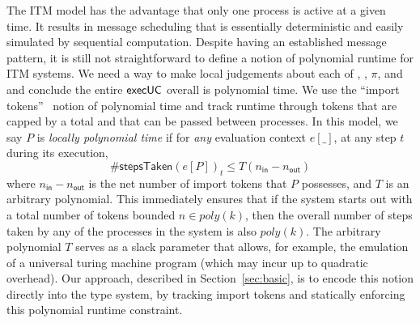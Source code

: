 The ITM model has the advantage that only one process is active at a given time. It results in message scheduling that is essentially deterministic and easily simulated by sequential computation. 
Despite having an established message pattern, it is still not straightforward to define a notion of polynomial runtime for ITM systems.
We need a way to make local judgements about each of \A, \Z, $\pi$, and \F and conclude the entire ${\mathsf {execUC}}$ overall is polynomial time. 
We use the ``import tokens''~\cite{canettiUC} notion of polynomial time and track runtime through tokens that are capped by a total and that can be passed between processes. 
In this model, we say $P$ is \emph{locally polynomial time} if for \emph{any} evaluation context $e[\_]$, at any step $t$ during its execution,
\[
\#\textsf{stepsTaken}(e[P])_{t} \le T(n_{\textsf{in}} - n_{\textsf{out}})
\]
where $n_{\textsf{in}} - n_{\textsf{out}}$ is the net number of import tokens that $P$ possesses, and $T$ is an arbitrary polynomial.
This immediately ensures that if the system starts out with a total number of tokens bounded $n \in poly(k)$, then the overall number of steps taken by any of the processes in the system is also $poly(k)$.
The arbitrary polynomial $T$ serves as a slack parameter that allows, for example, the emulation of a universal turing machine program (which may incur up to quadratic overhead).
Our approach, described in Section~\ref{sec:basic}, is to encode this notion directly into the type system, by tracking import tokens and statically enforcing this polynomial runtime constraint.

